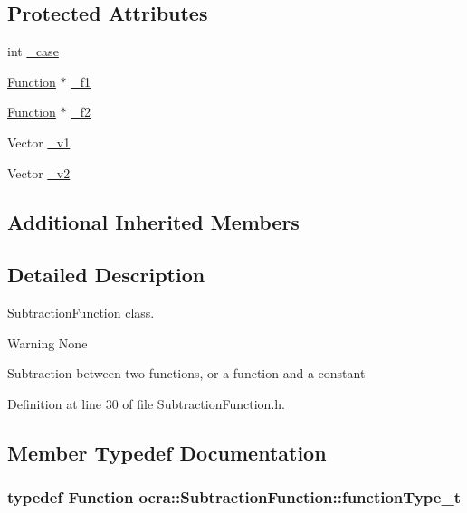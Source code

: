 \subsection*{Protected Attributes}
\begin{DoxyCompactItemize}
\item 
int \hyperlink{classocra_1_1SubtractionFunction_a2acdf28df1d3018d7c25cb8b16c879d1}{\+\_\+case}
\item 
\hyperlink{classocra_1_1Function}{Function} $\ast$ \hyperlink{classocra_1_1SubtractionFunction_a9adc6a235a48bdf90fe1ad4d4a18b7a0}{\+\_\+f1}
\item 
\hyperlink{classocra_1_1Function}{Function} $\ast$ \hyperlink{classocra_1_1SubtractionFunction_a22e626b681ffd6b9dd90ec4189ad431c}{\+\_\+f2}
\item 
Vector \hyperlink{classocra_1_1SubtractionFunction_a802ca5db967765779131701423f1b207}{\+\_\+v1}
\item 
Vector \hyperlink{classocra_1_1SubtractionFunction_a10736fb0de7f83a54a09055251cf4ad5}{\+\_\+v2}
\end{DoxyCompactItemize}
\subsection*{Additional Inherited Members}


\subsection{Detailed Description}
Subtraction\+Function class. 

\begin{DoxyWarning}{Warning}
None
\end{DoxyWarning}
Subtraction between two functions, or a function and a constant 

Definition at line 30 of file Subtraction\+Function.\+h.



\subsection{Member Typedef Documentation}
\subsubsection[{\texorpdfstring{function\+Type\+\_\+t}{functionType_t}}]{\setlength{\rightskip}{0pt plus 5cm}typedef {\bf Function} {\bf ocra\+::\+Subtraction\+Function\+::function\+Type\+\_\+t}}\hypertarget{classocra_1_1SubtractionFunction_a371966d5def8140a019099fc4346f413}{}\label{classocra_1_1SubtractionFunction_a371966d5def8140a019099fc4346f413}


